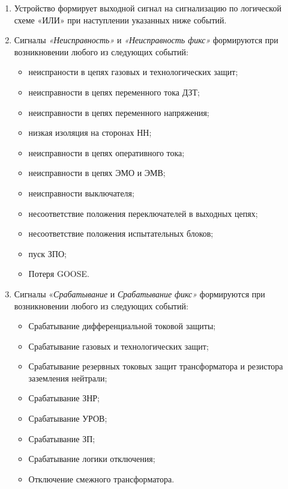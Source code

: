 \color{black}

\begin{enumerate}

\item
Устройство формирует выходной сигнал на сигнализацию по логической схеме «ИЛИ» при наступлении указанных ниже событий.

\item
Сигналы \textit{«Неисправность»} и \textit{«Неисправность фикс»} формируются при возникновении любого из следующих событий:
\begin{itemize}
\item неиспраности в цепях газовых и технологических защит;
\item неисправности в цепях переменного тока ДЗТ;
\item неисправности в цепях переменного напряжения;
\item низкая изоляция на сторонах НН;
\item неисправности в цепях оперативного тока;
\item неисправности в цепях ЭМО и ЭМВ;
\item неисправности выключателя;
\item несоответствие положения переключателей в выходных цепях;
\item несоответствие положения испытательных блоков;
\item пуск ЗПО;  
\item Потеря GOOSE.
\end{itemize}

\item
Сигналы «\textit{Срабатывание} и \textit{Срабатывание фикс»} формируются при возникновении любого из следующих событий:
\begin{itemize}
\item Срабатывание дифференциальной токовой защиты;
\item Срабатывание газовых и технологических защит;
\item Срабатывание резервных токовых защит трансформатора и резистора заземления нейтрали;
\item Срабатывание ЗНР;
\item Срабатывание УРОВ;
\item Срабатывание ЗП;
\item Срабатывание логики отключения;
\item Отключение смежного трансформатора.
\end{itemize}


\end{enumerate}
